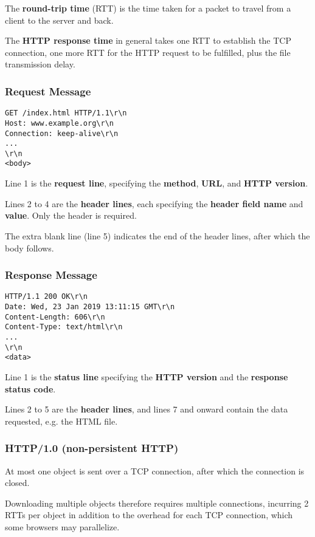 The \textbf{round-trip time} (RTT) is the time taken for a packet to travel from a client to the server and back.

The \textbf{HTTP response time} in general takes one RTT to establish the TCP connection, one more RTT for the
HTTP request to be fulfilled, plus the file transmission delay.

\subsubsection{Request Message}
\begin{lstlisting}
GET /index.html HTTP/1.1\r\n
Host: www.example.org\r\n
Connection: keep-alive\r\n
...
\r\n
<body>
\end{lstlisting}

Line 1 is the \textbf{request line}, specifying the \textbf{method}, \textbf{URL}, and \textbf{HTTP version}.

Lines 2 to 4 are the \textbf{header lines}, each specifying the \textbf{header field name} and \textbf{value}.
Only the  header is required.

The extra blank line (line 5) indicates the end of the header lines, after which the body follows.

\subsubsection{Response Message}
\begin{lstlisting}
HTTP/1.1 200 OK\r\n
Date: Wed, 23 Jan 2019 13:11:15 GMT\r\n
Content-Length: 606\r\n
Content-Type: text/html\r\n
...
\r\n
<data>
\end{lstlisting}

Line 1 is the \textbf{status line} specifying the \textbf{HTTP version} and the \textbf{response status code}.

Lines 2 to 5 are the \textbf{header lines}, and lines 7 and onward contain the data requested, e.g. the HTML file.

\subsubsection{HTTP/1.0 (non-persistent HTTP)}
At most one object is sent over a TCP connection, after which the connection is closed.

Downloading multiple objects therefore requires multiple connections, incurring 2 RTTs per object in addition to the overhead for each TCP
connection, which some browsers may parallelize.

